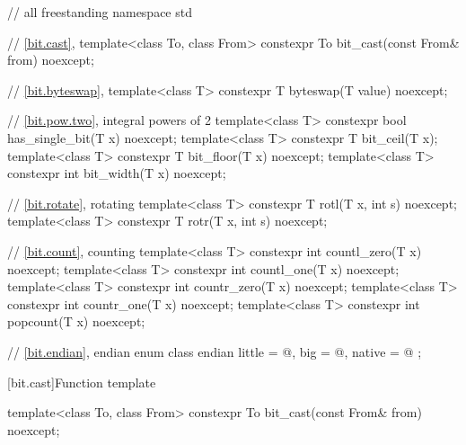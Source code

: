 \begin{codeblock}
// all freestanding
namespace std {
  // \ref{bit.cast}, 
  template<class To, class From>
    constexpr To bit_cast(const From& from) noexcept;

  // \ref{bit.byteswap}, 
  template<class T>
    constexpr T byteswap(T value) noexcept;

  // \ref{bit.pow.two}, integral powers of 2
  template<class T>
    constexpr bool has_single_bit(T x) noexcept;
  template<class T>
    constexpr T bit_ceil(T x);
  template<class T>
    constexpr T bit_floor(T x) noexcept;
  template<class T>
    constexpr int bit_width(T x) noexcept;

  // \ref{bit.rotate}, rotating
  template<class T>
    constexpr T rotl(T x, int s) noexcept;
  template<class T>
    constexpr T rotr(T x, int s) noexcept;

  // \ref{bit.count}, counting
  template<class T>
    constexpr int countl_zero(T x) noexcept;
  template<class T>
    constexpr int countl_one(T x) noexcept;
  template<class T>
    constexpr int countr_zero(T x) noexcept;
  template<class T>
    constexpr int countr_one(T x) noexcept;
  template<class T>
    constexpr int popcount(T x) noexcept;

  // \ref{bit.endian}, endian
  enum class endian {
    little = @\seebelow@,
    big    = @\seebelow@,
    native = @\seebelow@
  };
}
\end{codeblock}

[bit.cast]{Function template }

%
\begin{itemdecl}
template<class To, class From>
  constexpr To bit_cast(const From& from) noexcept;
\end{itemdecl}

